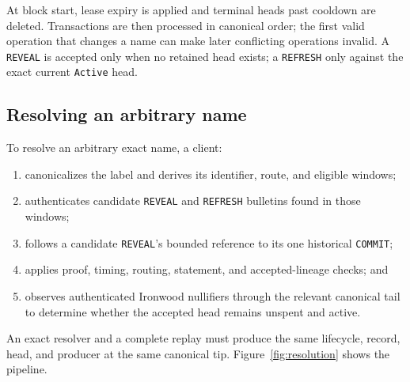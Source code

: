 \documentclass[11pt]{article}
\newcommand{\operation}[1]{\texttt{#1}}
\newcommand{\code}[1]{\texttt{#1}}
\begin{document}
At block start, lease expiry is applied and terminal heads past cooldown are
deleted. Transactions are then processed in canonical order; the first valid operation that
changes a name can make later conflicting operations invalid. A
\operation{REVEAL} is accepted only when no retained head exists; a \operation{REFRESH} only against the exact current
\code{Active} head.

\subsection{Resolving an arbitrary name}

To resolve an arbitrary exact name, a client:

\begin{enumerate}
\item canonicalizes the label and derives its identifier, route, and eligible
windows;
\item authenticates candidate \operation{REVEAL} and \operation{REFRESH}
bulletins found in those windows;
\item follows a candidate \operation{REVEAL}'s bounded reference to its one
historical \operation{COMMIT};
\item applies proof, timing, routing, statement, and accepted-lineage checks;
and
\item observes authenticated Ironwood nullifiers through the relevant
canonical tail to determine whether the accepted head remains unspent and
active.
\end{enumerate}

An exact resolver and a complete replay must produce the same lifecycle,
record, head, and producer at the same canonical tip.
Figure~\ref{fig:resolution} shows the pipeline.
\end{document}
